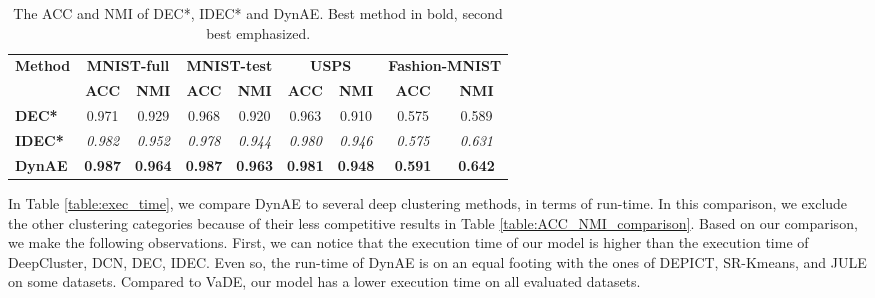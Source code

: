 \documentclass{article}
\begin{document}
\begin{table}[h!]
\vskip 0.1in
  \caption{The ACC and NMI of DEC*, IDEC* and DynAE. Best method in bold, second best emphasized.}
  \vskip 0.1in
  \begin{center}
  \begin{small}
  \begin{tabular}{|p{2.7cm}|c|c|c|c|c|c|c|c|}
    \hline
    {\textbf{Method}} & \multicolumn{2}{c|}{\textbf{MNIST-full}} & \multicolumn{2}{c|}{\textbf{MNIST-test}} & \multicolumn{2}{c|}{\textbf{USPS}} & \multicolumn{2}{c|}{\textbf{Fashion-MNIST}} \\
\cline{2-9}
    & \textbf{ACC} & \textbf{NMI} & \textbf{ACC} & \textbf{NMI} & \textbf{ACC} & \textbf{NMI} & \textbf{ACC} & \textbf{NMI} \\ \hline
    \textbf{DEC*} & 0.971 & 0.929 & 0.968 & 0.920 & 0.963 & 0.910 & 0.575 & 0.589 \\ \hline
    \textbf{IDEC*} & \textit{0.982} & \textit{0.952} & \textit{0.978} & \textit{0.944} & \textit{0.980} & \textit{0.946} & \textit{0.575} & \textit{0.631} \\ \hline
    \textbf{DynAE} & \textbf{0.987} & \textbf{0.964} & \textbf{0.987} & \textbf{0.963} & \textbf{0.981} & \textbf{0.948} & \textbf{0.591} & \textbf{0.642} \\ \hline 
  \end{tabular}
  \label{table:fair_comparison}
  \end{small}
  \end{center}
  \vskip 0.1in
\end{table}

In Table \ref{table:exec_time}, we compare DynAE to several deep clustering methods, in terms of run-time. In this comparison, we exclude the other clustering categories because of their less competitive results in Table \ref{table:ACC_NMI_comparison}. Based on our comparison, we make the following observations. First, we can notice that the execution time of our model is higher than the execution time of DeepCluster, DCN, DEC, IDEC. Even so, the run-time of DynAE is on an equal footing with the ones of DEPICT, SR-Kmeans, and JULE on some datasets. Compared to VaDE, our model has a lower execution time on all evaluated datasets.
\end{document}
